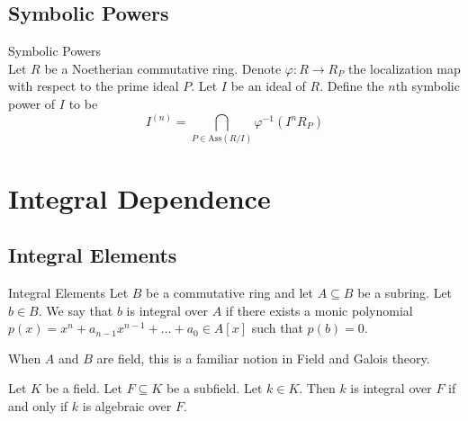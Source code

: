 \documentclass[a4paper]{article}
\begin{document}
\subsection{Symbolic Powers}
\begin{defn}{Symbolic Powers}{}\\
Let $R$ be a Noetherian commutative ring. Denote $\varphi:R\to R_P$ the localization map with respect to the prime ideal $P$. Let $I$ be an ideal of $R$. Define the $n$th symbolic power of $I$ to be $$I^{(n)}=\bigcap_{P\in\text{Ass}(R/I)}\varphi^{-1}(I^nR_P)$$
\end{defn}

\pagebreak
\section{Integral Dependence}
\subsection{Integral Elements}
\begin{defn}{Integral Elements}{} Let $B$ be a commutative ring and let $A\subseteq B$ be a subring. Let $b\in B$. We say that $b$ is integral over $A$ if there exists a monic polynomial $p(x)=x^n+a_{n-1}x^{n-1}+\dots+a_0\in A[x]$ such that $p(b)=0$. 
\end{defn}

When $A$ and $B$ are field, this is a familiar notion in Field and Galois theory. 

\begin{lmm}{}{} Let $K$ be a field. Let $F\subseteq K$ be a subfield. Let $k\in K$. Then $k$ is integral over $F$ if and only if $k$ is algebraic over $F$. 
\end{lmm}
\end{document}
